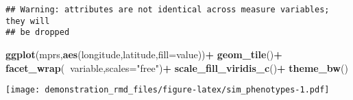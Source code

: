 \documentclass[]{article}
\newenvironment{Shaded}{\begin{snugshade}}{\end{snugshade}}
\newcommand{\CharTok}[1]{\textcolor[rgb]{0.31,0.60,0.02}{#1}}
\newcommand{\DataTypeTok}[1]{\textcolor[rgb]{0.13,0.29,0.53}{#1}}
\newcommand{\KeywordTok}[1]{\textcolor[rgb]{0.13,0.29,0.53}{\textbf{#1}}}
\newcommand{\NormalTok}[1]{#1}
\newcommand{\OperatorTok}[1]{\textcolor[rgb]{0.81,0.36,0.00}{\textbf{#1}}}
\newcommand{\OtherTok}[1]{\textcolor[rgb]{0.56,0.35,0.01}{#1}}
\newcommand{\StringTok}[1]{\textcolor[rgb]{0.31,0.60,0.02}{#1}}
\begin{document}
\begin{verbatim}
## Warning: attributes are not identical across measure variables; they will
## be dropped
\end{verbatim}

\begin{Shaded}
\begin{Highlighting}[]
\KeywordTok{ggplot}\NormalTok{(mprs,}\KeywordTok{aes}\NormalTok{(longitude,latitude,}\DataTypeTok{fill=}\NormalTok{value))}\OperatorTok{+}
\StringTok{  }\KeywordTok{geom_tile}\NormalTok{()}\OperatorTok{+}
\StringTok{  }\KeywordTok{facet_wrap}\NormalTok{(}\OperatorTok{~}\NormalTok{variable,}\DataTypeTok{scales=}\StringTok{"free"}\NormalTok{)}\OperatorTok{+}
\StringTok{  }\KeywordTok{scale_fill_viridis_c}\NormalTok{()}\OperatorTok{+}
\StringTok{  }\KeywordTok{theme_bw}\NormalTok{()}
\end{Highlighting}
\end{Shaded}

\texttt{[image: demonstration\_rmd\_files/figure-latex/sim\_phenotypes-1.pdf]}

\begin{Shaded}
\end{Shaded}
\end{document}
